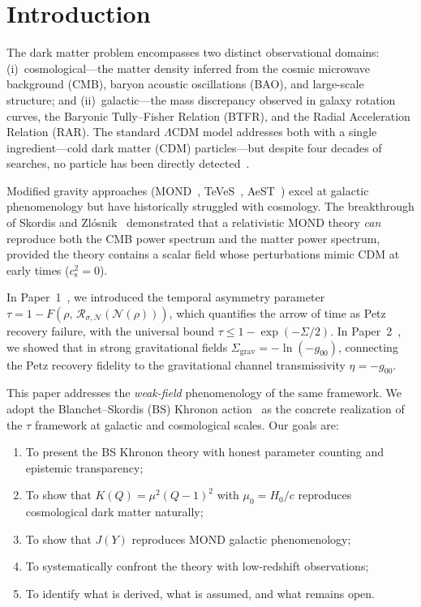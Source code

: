 \documentclass[prd,twocolumn,superscriptaddress,longbibliography,floatfix]{revtex4-2}
\newcommand{\tauasym}{\tau}
\newcommand{\cs}{c_{\mathrm{s}}}
\begin{document}
\section{Introduction}
\label{sec:intro}

The dark matter problem encompasses two distinct observational
domains: (i)~cosmological---the matter density inferred from
the cosmic microwave background (CMB), baryon acoustic oscillations
(BAO), and large-scale structure; and (ii)~galactic---the mass
discrepancy observed in galaxy rotation curves, the Baryonic
Tully--Fisher Relation (BTFR), and the Radial Acceleration
Relation (RAR).  The standard $\Lambda$CDM model addresses both
with a single ingredient---cold dark matter (CDM) particles---but
despite four decades of searches, no particle has been directly
detected~\cite{Schumann2019,XENON2023,LZ2024}.

Modified gravity approaches (MOND~\cite{Milgrom1983},
TeVeS~\cite{Bekenstein2004}, AeST~\cite{SZ2021prl,SZ2021extended})
excel at galactic phenomenology but have historically struggled
with cosmology.  The breakthrough of Skordis and
Zl\'{o}snik~\cite{SZ2021prl} demonstrated that a relativistic
MOND theory \emph{can} reproduce both the CMB power spectrum and
the matter power spectrum, provided the theory contains a scalar
field whose perturbations mimic CDM at early times ($\cs^2 = 0$).

In Paper~1~\cite{Paper1}, we introduced the temporal asymmetry
parameter $\tauasym = 1 - F(\rho,\,\mathcal{R}_{\sigma,\mathcal{N}}
(\mathcal{N}(\rho)))$, which quantifies the arrow of time as Petz
recovery failure, with the universal bound
$\tauasym \leq 1 - \exp(-\Sigma/2)$.  In Paper~2~\cite{Paper2},
we showed that in strong gravitational fields
$\Sigma_{\mathrm{grav}} = -\ln(-g_{00})$, connecting the Petz
recovery fidelity to the gravitational channel transmissivity
$\eta = -g_{00}$.

This paper addresses the \emph{weak-field} phenomenology of the
same framework.  We adopt the Blanchet--Skordis (BS) Khronon
action~\cite{BS2024} as the concrete realization of the $\tauasym$
framework at galactic and cosmological scales.  Our goals are:
\begin{enumerate}
\item To present the BS Khronon theory with honest parameter
  counting and epistemic transparency;
\item To show that $K(Q) = \mu^2(Q-1)^2$ with $\mu_0 = H_0/c$
  reproduces cosmological dark matter naturally;
\item To show that $J(Y)$ reproduces MOND galactic phenomenology;
\item To systematically confront the theory with low-redshift
  observations;
\item To identify what is derived, what is assumed, and what
  remains open.
\end{enumerate}
\end{document}
